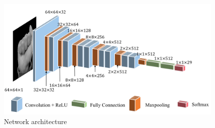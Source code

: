 \documentclass[10pt,twocolumn,letterpaper]{article}
\begin{document}
\begin{figure}[ht]
\begin{center}
\includegraphics[width=0.8\linewidth]{imgs/arch}
\end{center}
   \caption{Network architecture}
\label{fig:arch}
\end{figure}
\end{document}
